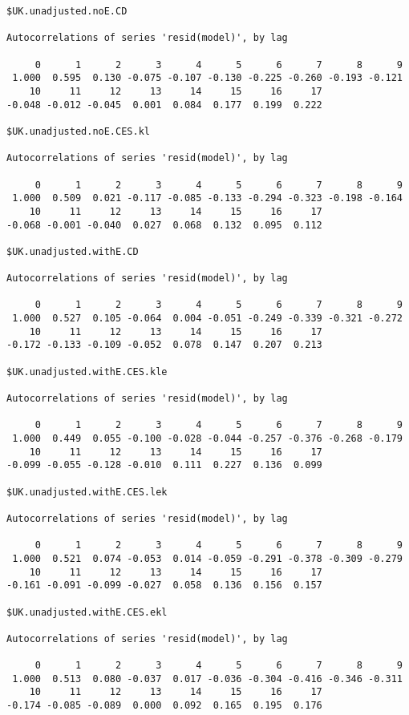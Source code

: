 \documentclass[preprint,authoryear,12pt]{elsarticle}\usepackage[]{graphicx}\usepackage[]{color}
\makeatletter
\newenvironment{kframe}{%
 \def\at@end@of@kframe{}%
 \ifinner\ifhmode%
  \def\at@end@of@kframe{\end{minipage}}%
  \begin{minipage}{\columnwidth}%
 \fi\fi%
 \def\FrameCommand##1{\hskip\@totalleftmargin \hskip-\fboxsep
 \colorbox{shadecolor}{##1}\hskip-\fboxsep
     \hskip-\linewidth \hskip-\@totalleftmargin \hskip\columnwidth}%
 \MakeFramed {\advance\hsize-\width
   \@totalleftmargin\z@ \linewidth\hsize
   \@setminipage}}%
 {\par\unskip\endMakeFramed%
 \at@end@of@kframe}
\newenvironment{knitrout}{}{} %
\makeatother
\begin{document}
\begin{knitrout}
\begin{kframe}
\begin{verbatim}
$UK.unadjusted.noE.CD

Autocorrelations of series 'resid(model)', by lag

     0      1      2      3      4      5      6      7      8      9 
 1.000  0.595  0.130 -0.075 -0.107 -0.130 -0.225 -0.260 -0.193 -0.121 
    10     11     12     13     14     15     16     17 
-0.048 -0.012 -0.045  0.001  0.084  0.177  0.199  0.222 

$UK.unadjusted.noE.CES.kl

Autocorrelations of series 'resid(model)', by lag

     0      1      2      3      4      5      6      7      8      9 
 1.000  0.509  0.021 -0.117 -0.085 -0.133 -0.294 -0.323 -0.198 -0.164 
    10     11     12     13     14     15     16     17 
-0.068 -0.001 -0.040  0.027  0.068  0.132  0.095  0.112 

$UK.unadjusted.withE.CD

Autocorrelations of series 'resid(model)', by lag

     0      1      2      3      4      5      6      7      8      9 
 1.000  0.527  0.105 -0.064  0.004 -0.051 -0.249 -0.339 -0.321 -0.272 
    10     11     12     13     14     15     16     17 
-0.172 -0.133 -0.109 -0.052  0.078  0.147  0.207  0.213 

$UK.unadjusted.withE.CES.kle

Autocorrelations of series 'resid(model)', by lag

     0      1      2      3      4      5      6      7      8      9 
 1.000  0.449  0.055 -0.100 -0.028 -0.044 -0.257 -0.376 -0.268 -0.179 
    10     11     12     13     14     15     16     17 
-0.099 -0.055 -0.128 -0.010  0.111  0.227  0.136  0.099 

$UK.unadjusted.withE.CES.lek

Autocorrelations of series 'resid(model)', by lag

     0      1      2      3      4      5      6      7      8      9 
 1.000  0.521  0.074 -0.053  0.014 -0.059 -0.291 -0.378 -0.309 -0.279 
    10     11     12     13     14     15     16     17 
-0.161 -0.091 -0.099 -0.027  0.058  0.136  0.156  0.157 

$UK.unadjusted.withE.CES.ekl

Autocorrelations of series 'resid(model)', by lag

     0      1      2      3      4      5      6      7      8      9 
 1.000  0.513  0.080 -0.037  0.017 -0.036 -0.304 -0.416 -0.346 -0.311 
    10     11     12     13     14     15     16     17 
-0.174 -0.085 -0.089  0.000  0.092  0.165  0.195  0.176 


\end{verbatim}
\end{kframe}
\end{knitrout}
\end{document}
